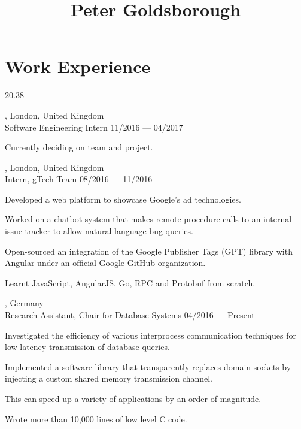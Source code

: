 




\begin{header}
	\title{Peter Goldsborough}
	\separate
	\separate
\end{header}

\section{Work Experience}{2}{0.38}

\begin{entry}
	{, London, United Kingdom}
	{\\Software Engineering Intern}
	{11/2016 --- 04/2017}
	\item Currently deciding on team and project.
\end{entry}

\vspace{-2mm}
\begin{entry}
	{, London, United Kingdom}
	{\\Intern, gTech Team}
	{08/2016 --- 11/2016}
  \item Developed a web platform to showcase Google’s ad technologies.
  \item Worked on a chatbot system that makes remote procedure calls to an internal issue tracker to allow natural language bug queries.
  \item Open-sourced an integration of the Google Publisher Tags (GPT) library with Angular under an official Google GitHub organization.
  \item Learnt JavaScript, AngularJS, Go, RPC and Protobuf from scratch.
\end{entry}

\begin{entry}
	{, Germany}
	{\\Research Assistant, Chair for Database Systems}
	{04/2016 --- Present}

  \item Investigated the efficiency of various interprocess communication techniques for low-latency transmission of database queries.
  \item Implemented a software library that transparently replaces domain sockets by injecting a custom shared memory transmission channel.
  \item This can speed up a variety of applications by an order of magnitude.
  \item Wrote more than 10,000 lines of low level C code.
\end{entry}

